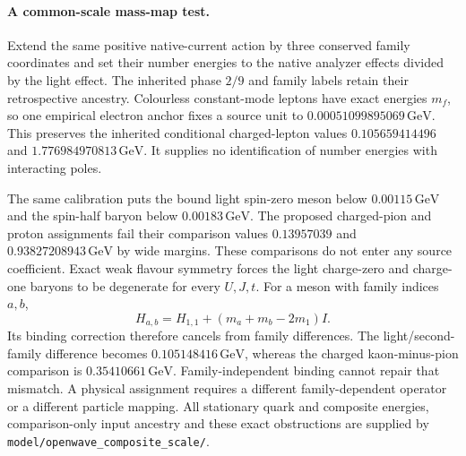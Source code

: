 \paragraph{A common-scale mass-map test.}
Extend the same positive native-current action by three conserved family
coordinates and set their number energies to the native analyzer effects
divided by the light effect. The inherited phase $2/9$ and family labels
retain their retrospective ancestry. Colourless constant-mode leptons have
exact energies $m_f$, so one empirical electron anchor fixes a source unit
to $0.00051099895069\,\mathrm{GeV}$. This preserves the inherited conditional
charged-lepton values $0.105659414496$ and $1.776984970813\,\mathrm{GeV}$.
It supplies no identification of number energies with interacting poles.

The same calibration puts the bound light spin-zero meson below
$0.00115\,\mathrm{GeV}$ and the spin-half baryon below $0.00183\,\mathrm{GeV}$.
The proposed charged-pion and proton assignments fail their comparison
values $0.13957039$ and $0.93827208943\,\mathrm{GeV}$ by wide margins.
These comparisons do not enter any source coefficient. Exact weak flavour
symmetry forces the light charge-zero and charge-one baryons to be degenerate
for every $U,J,t$. For a meson with family indices $a,b$,
\[
 H_{a,b}=H_{1,1}+(m_a+m_b-2m_1)I.
\]
Its binding correction therefore cancels from family differences. The
light/second-family difference becomes $0.105148416\,\mathrm{GeV}$, whereas
the charged kaon-minus-pion comparison is $0.35410661\,\mathrm{GeV}$.
Family-independent binding cannot repair that mismatch. A physical assignment
requires a different family-dependent operator or a different particle mapping.
All stationary quark and composite energies, comparison-only input ancestry
and these exact obstructions are supplied by
\texttt{model/openwave\_composite\_scale/}.

